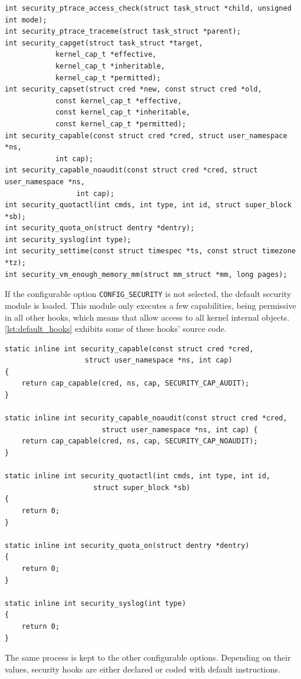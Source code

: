 \begin{lstlisting}[style=CInputStyle, caption=Security functions declaration (Linux kernel v3.11), label=lst:hooks]
int security_ptrace_access_check(struct task_struct *child, unsigned int mode);
int security_ptrace_traceme(struct task_struct *parent);
int security_capget(struct task_struct *target,
		    kernel_cap_t *effective,
		    kernel_cap_t *inheritable,
		    kernel_cap_t *permitted);
int security_capset(struct cred *new, const struct cred *old,
		    const kernel_cap_t *effective,
		    const kernel_cap_t *inheritable,
		    const kernel_cap_t *permitted);
int security_capable(const struct cred *cred, struct user_namespace *ns,
			int cap);
int security_capable_noaudit(const struct cred *cred, struct user_namespace *ns,
			     int cap);
int security_quotactl(int cmds, int type, int id, struct super_block *sb);
int security_quota_on(struct dentry *dentry);
int security_syslog(int type);
int security_settime(const struct timespec *ts, const struct timezone *tz);
int security_vm_enough_memory_mm(struct mm_struct *mm, long pages);
\end{lstlisting}


If the configurable option \texttt{CONFIG\_SECURITY} is not selected, the default security module is loaded. This module only executes a few capabilities, being permissive in all other hooks, which means that allow access to all kernel internal objects. \autoref{lst:default_hooks} exhibits some of these hooks' source code.

\begin{lstlisting}[style=CInputStyle, caption=Default security functions (Linux kernel v3.11), label=lst:default_hooks]
static inline int security_capable(const struct cred *cred,
				   struct user_namespace *ns, int cap)
{
	return cap_capable(cred, ns, cap, SECURITY_CAP_AUDIT);
}

static inline int security_capable_noaudit(const struct cred *cred,
					   struct user_namespace *ns, int cap) {
	return cap_capable(cred, ns, cap, SECURITY_CAP_NOAUDIT);
}

static inline int security_quotactl(int cmds, int type, int id,
				     struct super_block *sb)
{
	return 0;
}

static inline int security_quota_on(struct dentry *dentry)
{
	return 0;
}

static inline int security_syslog(int type)
{
	return 0;
}
\end{lstlisting}


The same process is kept to the other configurable options. Depending on their values, security hooks are either declared or coded with default instructions.

